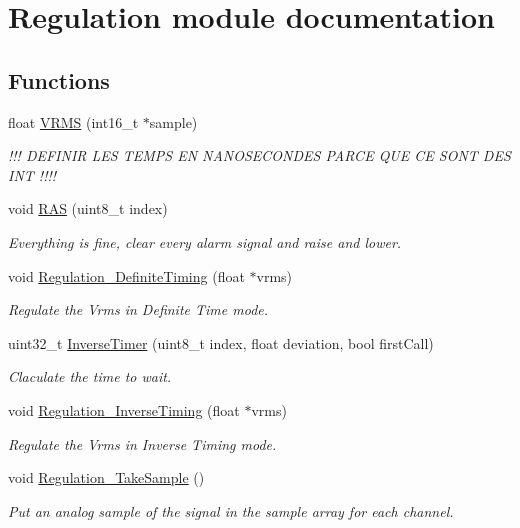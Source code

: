 \hypertarget{group___regulation__module}{}\section{Regulation module documentation}
\label{group___regulation__module}
\subsection*{Functions}
\begin{DoxyCompactItemize}
\item 
float \hyperlink{group___regulation__module_gaecb14fdd80805f02ca967b49a1bc2e20}{V\+R\+M\+S} (int16\+\_\+t $\ast$sample)
\begin{DoxyCompactList}\small\item\em !!! D\+E\+F\+I\+N\+I\+R L\+E\+S T\+E\+M\+P\+S E\+N N\+A\+N\+O\+S\+E\+C\+O\+N\+D\+E\+S P\+A\+R\+C\+E Q\+U\+E C\+E S\+O\+N\+T D\+E\+S I\+N\+T !!!! \end{DoxyCompactList}\item 
void \hyperlink{group___regulation__module_ga244fefc49036b90bb0f7f006bf5b84ef}{R\+A\+S} (uint8\+\_\+t index)
\begin{DoxyCompactList}\small\item\em Everything is fine, clear every alarm signal and raise and lower. \end{DoxyCompactList}\item 
void \hyperlink{group___regulation__module_gace524fa89c705529ef2d4088a07fe54b}{Regulation\+\_\+\+Definite\+Timing} (float $\ast$vrms)
\begin{DoxyCompactList}\small\item\em Regulate the Vrms in Definite Time mode. \end{DoxyCompactList}\item 
uint32\+\_\+t \hyperlink{group___regulation__module_gaf6f9cb6155a90f14471a17f55bcd9ae4}{Inverse\+Timer} (uint8\+\_\+t index, float deviation, bool first\+Call)
\begin{DoxyCompactList}\small\item\em Claculate the time to wait. \end{DoxyCompactList}\item 
void \hyperlink{group___regulation__module_gac992375e081f2af601f878f18a32fa5d}{Regulation\+\_\+\+Inverse\+Timing} (float $\ast$vrms)
\begin{DoxyCompactList}\small\item\em Regulate the Vrms in Inverse Timing mode. \end{DoxyCompactList}\item 
void \hyperlink{group___regulation__module_ga3a5fb5a92290ae37379c5c002b050e78}{Regulation\+\_\+\+Take\+Sample} ()
\begin{DoxyCompactList}\small\item\em Put an analog sample of the signal in the sample array for each channel. \end{DoxyCompactList}\end{DoxyCompactItemize}
